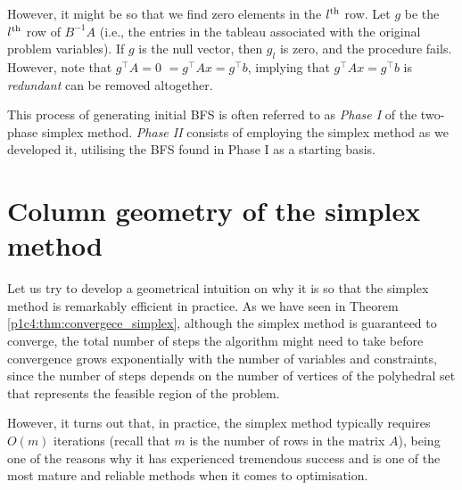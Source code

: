 However, it might be so that we find zero elements in the $l^\text{th}$ row. Let $g$ be the $l^\text{th}$ row of $B^{-1}A$ (i.e., the entries in the tableau associated with the original problem variables). If $g$ is the null vector, then $g_l$ is zero, and the procedure fails. However, note that $g^\top A = 0 $ $= g^\top Ax = g^\top b$, implying that $g^\top Ax = g^\top b$ is \emph{redundant} can be removed altogether. 

This process of generating initial BFS is often referred to as \emph{Phase I} of the two-phase simplex method. \emph{Phase II} consists of employing the simplex method as we developed it, utilising the BFS found in Phase I as a starting basis.


\section{Column geometry of the simplex method}

Let us try to develop a geometrical intuition on why it is so that the simplex method is remarkably efficient in practice. As we have seen in Theorem \ref{p1c4:thm:convergece_simplex}, although the simplex method is guaranteed to converge, the total number of steps the algorithm might need to take before convergence grows exponentially with the number of variables and constraints, since the number of steps depends on the number of vertices of the polyhedral set that represents the feasible region of the problem. 

However, it turns out that, in practice, the simplex method typically requires $O(m)$ iterations (recall that $m$ is the number of rows in the matrix $A$), being one of the reasons why it has experienced tremendous success and is one of the most mature and reliable methods when it comes to optimisation. 

